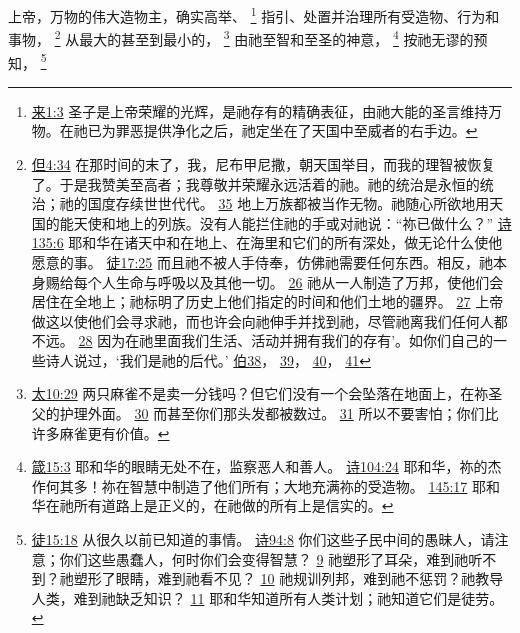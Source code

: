 \documentclass[12pt, a4paper, oneside]{ctexart}
\newcounter{parnum}[section]
\newcommand{\N}{%
   \noindent\refstepcounter{parnum}%
    \makebox[\parindent][l]{\textbf{\arabic{parnum}.}}}
\begin{document}
\N 上帝，万物的伟大造物主，确实高举、
	\footnote {
		\href{https://biblehub.com/hebrews/1-3.htm}{来1:3} 圣子是上帝荣耀的光辉，是祂存有的精确表征，由祂大能的圣言维持万物。在祂已为罪恶提供净化之后，祂定坐在了天国中至威者的右手边。
	}
	指引、处置并治理所有受造物、行为和事物，
	\footnote {
		\href{https://biblehub.com/daniel/4-34.htm}{但4:34} 在那时间的末了，我，尼布甲尼撒，朝天国举目，而我的理智被恢复了。于是我赞美至高者；我尊敬并荣耀永远活着的祂。祂的统治是永恒的统治；祂的国度存续世世代代。
		\href{https://biblehub.com/daniel/4-35.htm}{35} 地上万族都被当作无物。祂随心所欲地用天国的能天使和地上的列族。没有人能拦住祂的手或对祂说：“祢已做什么？”
		\href{https://biblehub.com/psalms/135-6.htm}{诗135:6} 耶和华在诸天中和在地上、在海里和它们的所有深处，做无论什么使他愿意的事。
		\href{https://biblehub.com/acts/17-25.htm}{徒17:25} 而且祂不被人手侍奉，仿佛祂需要任何东西。相反，祂本身赐给每个人生命与呼吸以及其他一切。
		\href{https://biblehub.com/acts/17-26.htm}{26} 祂从一人制造了万邦，使他们会居住在全地上；祂标明了历史上他们指定的时间和他们土地的疆界。
		\href{https://biblehub.com/acts/17-27.htm}{27} 上帝做这以使他们会寻求祂，而也许会向祂伸手并找到祂，尽管祂离我们任何人都不远。
		\href{https://biblehub.com/acts/17-28.htm}{28} 因为在祂里面我们生活、活动并拥有我们的存有’。如你们自己的一些诗人说过，‘我们是祂的后代。’
		\href{https://biblehub.com/niv/job/38.htm}{伯38}，
		\href{https://biblehub.com/niv/job/39.htm}{39}，
		\href{https://biblehub.com/niv/job/40.htm}{40}，
		\href{https://biblehub.com/niv/job/41.htm}{41}
	}
	从最大的甚至到最小的，
	\footnote {
		\href{https://biblehub.com/matthew/10-29.htm}{太10:29} 两只麻雀不是卖一分钱吗？但它们没有一个会坠落在地面上，在祢圣父的护理外面。
		\href{https://biblehub.com/matthew/10-30.htm}{30} 而甚至你们那头发都被数过。
		\href{https://biblehub.com/matthew/10-31.htm}{31} 所以不要害怕；你们比许多麻雀更有价值。
	}
	由祂至智和至圣的神意，
	\footnote {
		\href{https://biblehub.com/proverbs/15-3.htm}{箴15:3} 耶和华的眼睛无处不在，监察恶人和善人。
		\href{https://biblehub.com/psalms/104-24.htm}{诗104:24} 耶和华，祢的杰作何其多！祢在智慧中制造了他们所有；大地充满祢的受造物。
		\href{https://biblehub.com/psalms/145-17.htm}{145:17} 耶和华在祂所有道路上是正义的，在祂做的所有上是信实的。
	}
	按祂无谬的预知，
	\footnote {
		\href{https://biblehub.com/acts/15-18.htm}{徒15:18} 从很久以前已知道的事情。
		\href{https://biblehub.com/psalms/94-8.htm}{诗94:8} 你们这些子民中间的愚昧人，请注意；你们这些愚蠢人，何时你们会变得智慧？
		\href{https://biblehub.com/psalms/94-9.htm}{9} 祂塑形了耳朵，难到祂听不到？祂塑形了眼睛，难到祂看不见？
		\href{https://biblehub.com/psalms/94-10.htm}{10} 祂规训列邦，难到祂不惩罚？祂教导人类，难到祂缺乏知识？
		\href{https://biblehub.com/psalms/94-11.htm}{11} 耶和华知道所有人类计划；祂知道它们是徒劳。
	}
\end{document}

